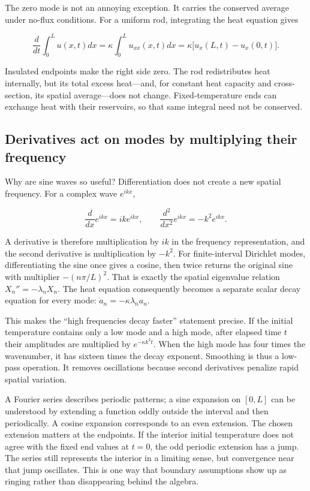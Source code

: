 The zero mode is not an annoying exception. It carries the conserved average under no-flux conditions. For a uniform rod, integrating the heat equation gives

\[
\frac{d}{dt}\int_0^L u(x,t)dx
=\kappa\int_0^L u_{xx}(x,t)dx
=\kappa\big[u_x(L,t)-u_x(0,t)\big].
\]

Insulated endpoints make the right side zero. The rod redistributes heat internally, but its total excess heat---and, for constant heat capacity and cross-section, its spatial average---does not change. Fixed-temperature ends can exchange heat with their reservoirs, so that same integral need not be conserved.

\subsection{Derivatives act on modes by multiplying their frequency}\label{02-foundations-ii-ch025-derivatives-act-on-modes-by-multiplying-their-frequency}

Why are sine waves so useful? Differentiation does not create a new spatial frequency. For a complex wave \(e^{ikx}\),

\[
\frac{d}{dx}e^{ikx}=ik e^{ikx},
\qquad
\frac{d^2}{dx^2}e^{ikx}=-k^2 e^{ikx}.
\]

A derivative is therefore multiplication by \(ik\) in the frequency representation, and the second derivative is multiplication by \(-k^2\). For finite-interval Dirichlet modes, differentiating the sine once gives a cosine, then twice returns the original sine with multiplier \(-(n\pi/L)^2\). That is exactly the spatial eigenvalue relation \(X_n''=-\lambda_nX_n\). The heat equation consequently becomes a separate scalar decay equation for every mode: \(\dot a_n=-\kappa\lambda_na_n\).

This makes the ``high frequencies decay faster'' statement precise. If the initial temperature contains only a low mode and a high mode, after elapsed time \(t\) their amplitudes are multiplied by \(e^{-\kappa k^2t}\). When the high mode has four times the wavenumber, it has sixteen times the decay exponent. Smoothing is thus a low-pass operation. It removes oscillations because second derivatives penalize rapid spatial variation.

A Fourier series describes periodic patterns; a sine expansion on \([0,L]\) can be understood by extending a function oddly outside the interval and then periodically. A cosine expansion corresponds to an even extension. The chosen extension matters at the endpoints. If the interior initial temperature does not agree with the fixed end values at \(t=0\), the odd periodic extension has a jump. The series still represents the interior in a limiting sense, but convergence near that jump oscillates. This is one way that boundary assumptions show up as ringing rather than disappearing behind the algebra.


